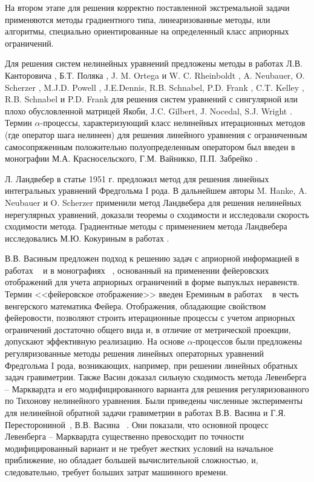 {На втором этапе для решения корректно поставленной экстремальной задачи применяются методы градиентного типа, линеаризованные методы, или алгоритмы, специально ориентированные на определенный класс априорных ограничений.

Для решения систем нелинейных уравнений предложены методы в работах Л.В. Канторовича \cite{Kan1947}, Б.Т. Поляка \cite{Pol1969}, J. M. Ortega и W. C. Rheinboldt \cite{OrtRhe1970}, A. Neubauer, O. Scherzer \cite{NeuSch1995, Sch1995}, M.J.D. Powell \cite{Pow1970}, J.E.Dennis, R.B. Schnabel, P.D. Frank \cite{DenSchn1996}, C.T. Kelley \cite{Kel1995}, R.B. Schnabel и P.D. Frank \cite{SchnFra1983} для решения систем уравнений с сингулярной или плохо обусловленной матрицей Якоби, J.C. Gilbert, J. Nocedal, S.J. Wright \cite{GilNoc1991, NocWri2006}. Термин $\alpha$-процессы, характеризующий класс нелинейных итерационных методов (где оператор шага нелинеен) для решения линейного уравнения с ограниченным самосопряженным положительно полуопределенным оператором был введен в монографии М.А. Красносельского, Г.М. Вайникко, П.П. Забрейко \cite{KraVayZab1969}.

Л. Ландвебер в статье \cite{Lan1951} 1951 г. предложил метод для решения линейных интегральных уравнений Фредгольма I рода. В дальнейшем авторы M. Hanke, A. Neubauer и O. Scherzer \cite{HanNeuSch1995,Neu2000,NeuSch1995} применили метод Ландвебера для решения нелинейных нерегулярных уравнений, доказали теоремы о сходимости и исследовали скорость сходимости метода. Градиентные методы с применением метода Ландвебера исследовались М.Ю. Кокуриным в работах \cite{Kok2010_1,Kok2010_2}.

В.В. Васиным предложен подход к решению задач с априорной информацией в работах ~\cite{Vas1982, Vas1988} и в монографиях ~\cite{VasAge1993, VasEre2005}, основанный на применении фейеровских отображений для учета априорных ограничений в форме выпуклых неравенств. Термин <<фейеровское отображение>> введен Ереминым в работах ~\cite{Ere1965, Ere1966, Ere1968} в честь венгерского математика Фейера. Отображения, обладающие свойством фейеровости, позволяют строить итерационные процессы с учетом априорных ограничений достаточно общего вида и, в отличие от метрической проекции, допускают эффективную реализацию. На основе $\alpha$-процессов были предложены регуляризованные методы решения линейных операторных уравнений Фредгольма I рода, возникающих, например, при решении линейных обратных задач гравиметрии. Также Васин доказал сильную сходимость метода Левенберга -- Марквардта и его модифицированного варианта для решения регуляризованного по Тихонову нелинейного уравнения. Были приведены численные эксперименты для нелинейной обратной задачи гравиметрии в работах В.В. Васина и Г.Я. Пересторониной~\cite{VasPer2011}, В.В. Васина ~\cite{Vas2012}. Они показали, что основной процесс Левенберга -- Марквардта существенно превосходит по точности модифицированный вариант и не требует жестких условий на начальное приближение, но обладает большей вычислительной сложностью, и, следовательно, требует больших затрат машинного времени. 
}

